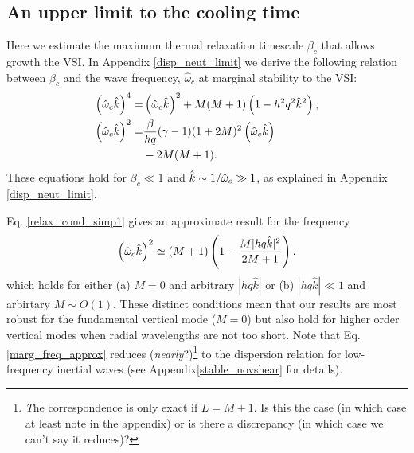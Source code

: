 \subsection{An upper limit to the cooling time}\label{iso_vsi_beta_crit}
Here we estimate the maximum thermal relaxation timescale 
$\beta_c$ that allows growth the VSI.  In Appendix \ref{disp_neut_limit}
we derive the following relation between $\beta_c$ and the wave frequency,
$\hat{\omega}_c$  at marginal stability to the VSI:
\begin{subequations}\begin{align}
 \left(\hat{\omega}_c\hat{k}\right)^4  = &  
 \left(\hat{\omega}_c\hat{k}\right)^2  + M(M+1)\left(1-h^2q^2\hat{k}^2\right) , \label{relax_cond_simp1} \\
   \left(\hat{\omega}_c\hat{k}\right)^2 = & \frac{\beta}{h q} (\gamma-1)(1+2M)^2
   \left(\hat{\omega}_c\hat{k}\right) \label{relax_cond_simp2}\\
   &- 2M(M+1) . \notag
\end{align}\end{subequations}
These equations hold for $\beta_c \ll 1$ and $\hat{k} \sim 1/\hat{\omega}_c \gg1$,
as explained in Appendix \ref{disp_neut_limit}.


Eq. \ref{relax_cond_simp1} gives an approximate result for the frequency
\begin{align}
  \left(\hat{\omega}_c\hat{k}\right)^2 \simeq (M+1)\left(1 -
    \frac{M|h q \hat{k}|^2}{2M+1}\right).  \label{marg_freq_approx}
\end{align}
which holds for either (a) $M= 0$ and arbitrary $|h q \hat{k}|$ or (b) $|h q \hat{k}| \ll 1$ and arbirtary $M \sim O(1)$. 
These distinct conditions mean that our results are most robust for the fundamental vertical mode ($M = 0$) but also
hold for higher order vertical modes when radial wavelengths are not too short.
Note that Eq. \ref{marg_freq_approx} 
reduces (\emph{nearly}?)\footnote{\emph The correspondence is only exact 
if $L = M+1$.  Is this the case (in which case at least note in the appendix) or is there a discrepancy (in which case 
we can't say it reduces)?}
 to the dispersion relation for low-frequency inertial waves 
(see Appendix\ref{stable_novshear} for details).

